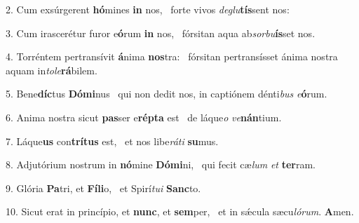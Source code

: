 2. Cum exsúrgerent \textbf{hó}mines \textbf{in} nos, \ast\  forte vivos \textit{de}\textit{glu}\textbf{tís}sent nos:\

3. Cum irascerétur furor e\textbf{ó}rum \textbf{in} nos, \ast\  fórsitan aqua ab\textit{sor}\textit{bu}\textbf{ís}set nos.\

4. Torréntem pertransívit \textbf{á}nima \textbf{nos}tra: \ast\  fórsitan pertransísset ánima nostra aquam in\textit{to}\textit{le}\textbf{rá}bilem.\

5. Bene\textbf{díc}tus \textbf{Dó}\textbf{mi}nus \ast\  qui non dedit nos, in captiónem dénti\textit{bus} \textit{e}\textbf{ó}rum.\

6. Anima nostra sicut \textbf{pas}ser e\textbf{rép}\textbf{ta} est \ast\  de láque\textit{o} \textit{ve}\textbf{nán}tium.\

7. Láque\textbf{us} con\textbf{trí}\textbf{tus} est, \ast\  et nos libe\textit{rá}\textit{ti} \textbf{su}mus.\

8. Adjutórium nostrum in \textbf{nó}mine \textbf{Dó}\textbf{mi}ni, \ast\  qui fecit cæ\textit{lum} \textit{et} \textbf{ter}ram.\

9. Glória \textbf{Pa}tri, et \textbf{Fí}\textbf{li}o, \ast\  et Spirí\textit{tu}\textit{i} \textbf{Sanc}to.\

10. Sicut erat in princípio, et \textbf{nunc}, et \textbf{sem}per, \ast\  et in sǽcula sæcu\textit{ló}\textit{rum}. \textbf{A}men.\

